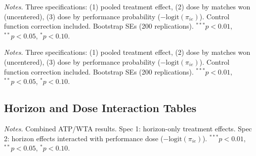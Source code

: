 \begin{table}[htbp]
\centering
\caption{Consolidated Tournament Performance: Non-Grand-Slam ATP}
\label{tab:tournament_consolidated_nongs_atp}
\begin{threeparttable}
\footnotesize

\begin{tablenotes}
\scriptsize
\item \textit{Notes.} Three specifications: (1) pooled treatment effect, (2) dose by matches won (uncentered), (3) dose by performance probability ($-\text{logit}(\pi_{ie})$). Control function correction included. Bootstrap SEs (200 replications). $^{***}p<0.01$, $^{**}p<0.05$, $^{*}p<0.10$.
\end{tablenotes}
\end{threeparttable}
\end{table}

\begin{table}[htbp]
\centering
\caption{Consolidated Tournament Performance: Non-Grand-Slam WTA}
\label{tab:tournament_consolidated_nongs_wta}
\begin{threeparttable}
\footnotesize

\begin{tablenotes}
\scriptsize
\item \textit{Notes.} Three specifications: (1) pooled treatment effect, (2) dose by matches won (uncentered), (3) dose by performance probability ($-\text{logit}(\pi_{ie})$). Control function correction included. Bootstrap SEs (200 replications). $^{***}p<0.01$, $^{**}p<0.05$, $^{*}p<0.10$.
\end{tablenotes}
\end{threeparttable}
\end{table}

\subsection{Horizon and Dose Interaction Tables}
\label{app:horizon_dose}

\begin{table}[htbp]
\centering
\caption{Match-Level Horizon and Performance Dose Interaction: Grand Slam}
\label{tab:horizon_dose_gs}
\begin{threeparttable}
\footnotesize

\begin{tablenotes}
\scriptsize
\item \textit{Notes.} Combined ATP/WTA results. Spec 1: horizon-only treatment effects. Spec 2: horizon effects interacted with performance dose ($-\text{logit}(\pi_{ie})$). $^{***}p<0.01$, $^{**}p<0.05$, $^{*}p<0.10$.
\end{tablenotes}
\end{threeparttable}
\end{table}

